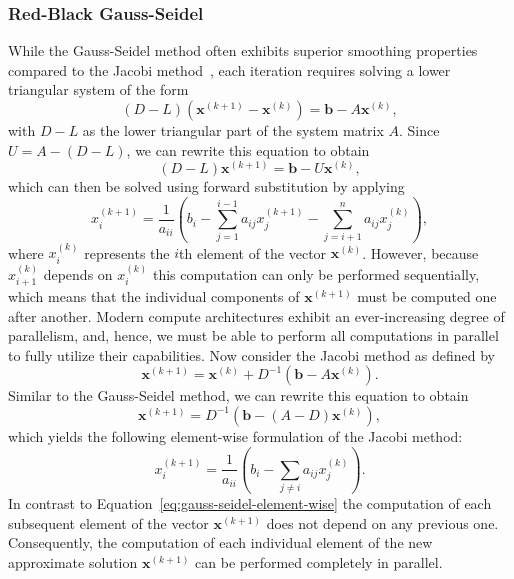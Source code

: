 \subsubsection{Red-Black Gauss-Seidel}
\label{sec:rb-gs}
While the Gauss-Seidel method often exhibits superior smoothing properties compared to the Jacobi method~\cite{briggs2000multigrid,trottenberg2000multigrid}, each iteration requires solving a lower triangular system of the form
\begin{equation*}
	(D - L) (\bm{x}^{(k+1)} - \bm{x}^{(k)}) = \bm{b} - A \bm{x}^{(k)},
\end{equation*}
with $D - L$ as the lower triangular part of the system matrix $A$.
Since $U = A - (D - L)$, we can rewrite this equation to obtain
\begin{equation*}
	(D - L) \bm{x}^{(k+1)} = \bm{b} - U \bm{x}^{(k)},
\end{equation*}  
which can then be solved using forward substitution by applying
\begin{equation}
	x_{i}^{(k+1)}={\frac {1}{a_{ii}}}\left(b_{i}-\sum _{j=1}^{i-1}a_{ij}x_{j}^{(k+1)}-\sum _{j=i+1}^{n}a_{ij}x_{j}^{(k)}\right),
	\label{eq:gauss-seidel-element-wise}
\end{equation}
where $x_{i}^{(k)}$ represents the $i$th element of the vector $\bm{x}^{(k)}$.
However, because $x_{i+1}^{(k)}$ depends on $x_{i}^{(k)}$ this computation can only be performed sequentially, which means that the individual components of $\bm{x}^{(k+1)}$ must be computed one after another. 
Modern compute architectures exhibit an ever-increasing degree of parallelism, and, hence, we must be able to perform all computations in parallel to fully utilize their capabilities.
Now consider the Jacobi method as defined by 
\begin{equation*}
	\bm{x}^{(k+1)} = \bm{x}^{(k)} + D^{-1}(\bm b - A \bm{x}^{(k)}).
\end{equation*}
Similar to the Gauss-Seidel method, we can rewrite this equation to obtain
\begin{equation*}
	\bm{x}^{(k+1)} = D^{-1}(\bm b - (A - D)\bm{x}^{(k)}),
\end{equation*}
which yields the following element-wise formulation of the Jacobi method:
\begin{equation}
x_{i}^{(k+1)}={\frac {1}{a_{ii}}}\left(b_{i}-\sum _{j\neq i}a_{ij}x_{j}^{(k)}\right).
	\label{eq:jacobi-element-wise}
\end{equation}
In contrast to Equation~\eqref{eq:gauss-seidel-element-wise} the computation of each subsequent element of the vector $\bm{x}^{(k+1)}$ does not depend on any previous one.
Consequently, the computation of each individual element of the new approximate solution $\bm{x}^{(k+1)}$ can be performed completely in parallel.

